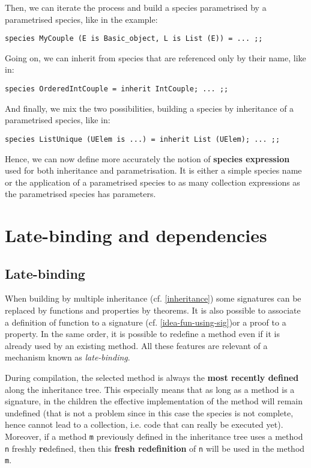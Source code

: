 Then, we can iterate the process and build
a species parametrised by a parametrised species, like in the example:
{\scriptsize
\begin{lstlisting}
species MyCouple (E is Basic_object, L is List (E)) = ... ;;
\end{lstlisting}
}

Going on, we can  inherit
from species that are referenced only by their name, like in:
{\scriptsize
\begin{lstlisting}
species OrderedIntCouple = inherit IntCouple; ... ;;
\end{lstlisting}
}

And finally, we mix the two possibilities, building a species by
inheritance of a parametrised species, like in: {\scriptsize
\begin{lstlisting}
species ListUnique (UElem is ...) = inherit List (UElem); ... ;;
\end{lstlisting}
}

Hence, we can now define more accurately the notion of {\bf species
expression} used for both inheritance and parametrisation. It is either
a simple species name or the application of a parametrised species to
as many collection expressions as the parametrised species has
parameters.


\section{Late-binding and dependencies}

\subsection{Late-binding}
\label{late-binding}
 When building by multiple inheritance
(cf. \ref{inheritance}) some signatures can be replaced by functions
and properties by theorems. It is also possible to associate a
definition of function to a signature (cf. \ref{idea-fun-using-sig})or
a proof to a property. In the same order, it is possible to redefine a
method even if it is  already used by an existing method.
All these features are relevant of a mechanism known as {\em late-binding}.


During compilation, the selected method is always the {\bf most
recently defined} along the inheritance tree. This especially means
that as long as a method is a signature, in the children the effective
implementation of the method will remain undefined (that is not a
problem since in this case the species is not complete, hence cannot
lead to a collection, i.e. code that can really be executed
yet). Moreover, if a method {\tt m} previously defined in the
inheritance tree uses a method {\tt n} freshly {\bf re}defined, then
this {\bf fresh redefinition} of {\tt n} will be used in the method
{\tt m}.

